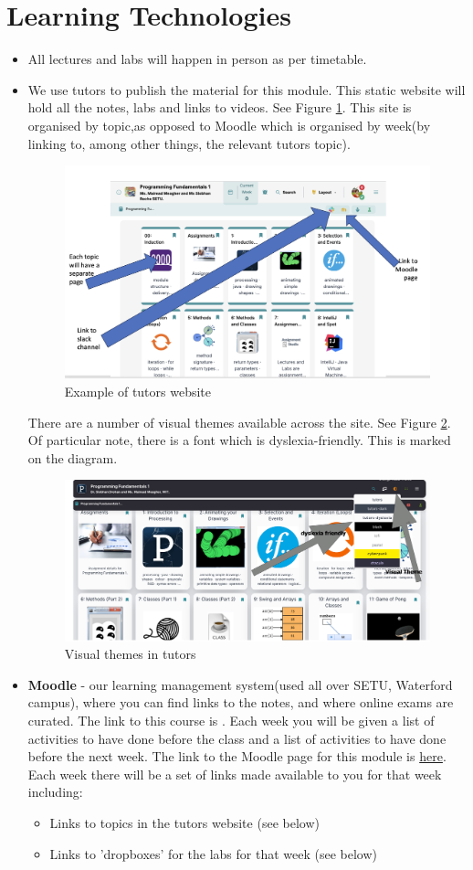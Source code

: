 \documentclass{article}
\begin{document}
\section{Learning Technologies}
\begin{itemize}
\item All lectures and labs  will happen in person as per timetable.
\item We use tutors to publish the material for this  module. This static website will hold all the notes, labs and links to videos.  See Figure \ref{tutors}.
This site is organised by topic,as opposed to Moodle which is organised by week(by linking to, among other things,  the relevant tutors topic).
\begin{figure}[h]
\centering
\includegraphics[width=.6\textwidth]{img/proc-tutors.png}
\caption{Example of tutors website}
\label{tutors}
\end{figure}

There are a number of visual themes available across the site.  See Figure \ref{visual}.
Of particular note, there is a font which is dyslexia-friendly. This is marked on the diagram. 
\begin{figure}[h]
\centering
\includegraphics[width=.6\textwidth]{img/v-theme.png}
\caption{Visual themes in tutors}
\label{visual}
\end{figure}
\item \textbf{Moodle} - our learning management system(used all over SETU, Waterford campus), 
where you can find links to the notes, and where online exams are curated. The link to this course is .  
Each week you will be given a list of activities to have done before the class and 
a list of activities to have done before the next week. 
The link to the Moodle page for this module is 
\href{https://moodle.wit.ie/course/view.php?id=206826} {here}.  \\
Each week there will be a set of links made available to you for that week including: 
\begin{itemize}
    \item Links to topics in the tutors website (see below)
    \item Links to 'dropboxes' for the labs for that week (see below)


\end{itemize}
\end{itemize}
\end{document}
